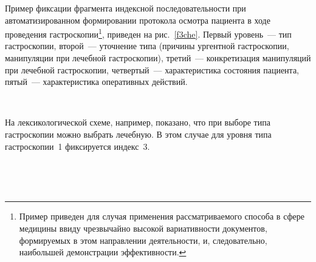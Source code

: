 \begin{multicols}{2}

    
     Пример фиксации фрагмента индексной последовательности при 
автоматизированном формировании протокола осмотра пациента в ходе 
проведения гастроскопии\footnote{Пример приведен для случая применения 
рассматриваемого способа в сфере медицины ввиду чрезвычайно высокой 
вариативности документов, формируемых в этом направлении деятельности, и, 
следовательно, наибольшей демонстрации эффективности.}, приведен на 
рис.~\ref{f3che}. 
%
Первый уровень~--- тип гастроскопии, второй~--- уточнение 
типа (причины ургентной гастроскопии, манипуляции при лечебной 
гастроскопии),
третий~--- конкретизация манипуляций при лечебной
гастроскопии, четвертый~--- характеристика состояния пациента, пятый~--- 
характеристика оперативных действий.

     




     
     
\begin{figure*} %
\vspace*{1pt}
\begin{center}
\mbox{%
\epsfxsize=155.053mm
}
\end{center}

\vspace*{-650pt}

\hspace{460pt}\hbox{}\hspace*{-6pt}
\end{figure*}

     На лексикологической схеме, например, показано, что при выборе типа 
гастроскопии можно  %
 выбрать лечебную. В этом случае для уровня типа 
гастроскопии~1 фиксируется индекс~3. %
     
     
     \begin{figure*} %
\vspace*{1pt}
\begin{center}
\mbox{%
\epsfxsize=158.479mm
}
\end{center}
\vspace*{-9pt}
     \end{figure*}
     \begin{figure*} %
\vspace*{1pt}
\begin{center}
\mbox{%
\epsfxsize=114.702mm
}
\end{center}
\vspace*{-9pt}
\end{figure*}


\end{multicols}
